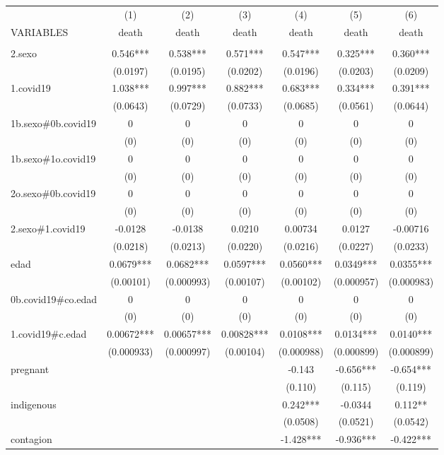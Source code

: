 \documentclass[]{article}
\begin{document}
\begin{tabular}{lcccccc} \hline
 & (1) & (2) & (3) & (4) & (5) & (6) \\
VARIABLES & death & death & death & death & death & death \\ \hline
 &  &  &  &  &  &  \\
2.sexo & 0.546*** & 0.538*** & 0.571*** & 0.547*** & 0.325*** & 0.360*** \\
 & (0.0197) & (0.0195) & (0.0202) & (0.0196) & (0.0203) & (0.0209) \\
1.covid19 & 1.038*** & 0.997*** & 0.882*** & 0.683*** & 0.334*** & 0.391*** \\
 & (0.0643) & (0.0729) & (0.0733) & (0.0685) & (0.0561) & (0.0644) \\
1b.sexo\#0b.covid19 & 0 & 0 & 0 & 0 & 0 & 0 \\
 & (0) & (0) & (0) & (0) & (0) & (0) \\
1b.sexo\#1o.covid19 & 0 & 0 & 0 & 0 & 0 & 0 \\
 & (0) & (0) & (0) & (0) & (0) & (0) \\
2o.sexo\#0b.covid19 & 0 & 0 & 0 & 0 & 0 & 0 \\
 & (0) & (0) & (0) & (0) & (0) & (0) \\
2.sexo\#1.covid19 & -0.0128 & -0.0138 & 0.0210 & 0.00734 & 0.0127 & -0.00716 \\
 & (0.0218) & (0.0213) & (0.0220) & (0.0216) & (0.0227) & (0.0233) \\
edad & 0.0679*** & 0.0682*** & 0.0597*** & 0.0560*** & 0.0349*** & 0.0355*** \\
 & (0.00101) & (0.000993) & (0.00107) & (0.00102) & (0.000957) & (0.000983) \\
0b.covid19\#co.edad & 0 & 0 & 0 & 0 & 0 & 0 \\
 & (0) & (0) & (0) & (0) & (0) & (0) \\
1.covid19\#c.edad & 0.00672*** & 0.00657*** & 0.00828*** & 0.0108*** & 0.0134*** & 0.0140*** \\
 & (0.000933) & (0.000997) & (0.00104) & (0.000988) & (0.000899) & (0.000899) \\
pregnant &  &  &  & -0.143 & -0.656*** & -0.654*** \\
 &  &  &  & (0.110) & (0.115) & (0.119) \\
indigenous &  &  &  & 0.242*** & -0.0344 & 0.112** \\
 &  &  &  & (0.0508) & (0.0521) & (0.0542) \\
contagion &  &  &  & -1.428*** & -0.936*** & -0.422*** \\

\end{tabular}
\end{document}
